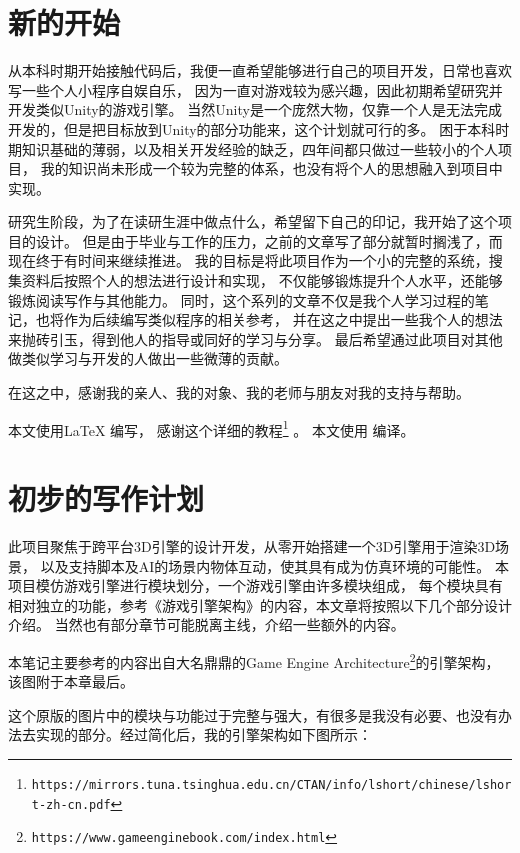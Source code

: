 \section{新的开始}

从本科时期开始接触代码后，我便一直希望能够进行自己的项目开发，日常也喜欢写一些个人小程序自娱自乐，
因为一直对游戏较为感兴趣，因此初期希望研究并开发类似Unity的游戏引擎。
当然Unity是一个庞然大物，仅靠一个人是无法完成开发的，但是把目标放到Unity的部分功能来，这个计划就可行的多。
困于本科时期知识基础的薄弱，以及相关开发经验的缺乏，四年间都只做过一些较小的个人项目，
我的知识尚未形成一个较为完整的体系，也没有将个人的思想融入到项目中实现。

研究生阶段，为了在读研生涯中做点什么，希望留下自己的印记，我开始了这个项目的设计。
但是由于毕业与工作的压力，之前的文章写了部分就暂时搁浅了，而现在终于有时间来继续推进。
我的目标是将此项目作为一个小的完整的系统，搜集资料后按照个人的想法进行设计和实现，
不仅能够锻炼提升个人水平，还能够锻炼阅读写作与其他能力。
同时，这个系列的文章不仅是我个人学习过程的笔记，也将作为后续编写类似程序的相关参考，
并在这之中提出一些我个人的想法来抛砖引玉，得到他人的指导或同好的学习与分享。
最后希望通过此项目对其他做类似学习与开发的人做出一些微薄的贡献。

在这之中，感谢我的亲人、我的对象、我的老师与朋友对我的支持与帮助。

本文使用\LaTeX{} 编写，
感谢这个详细的教程\footnote{\nolinkurl{https://mirrors.tuna.tsinghua.edu.cn/CTAN/info/lshort/chinese/lshort-zh-cn.pdf}} 。
本文使用\XeLaTeX{} 编译。

\maketitle
\section{初步的写作计划}

此项目聚焦于跨平台3D引擎的设计开发，从零开始搭建一个3D引擎用于渲染3D场景，
以及支持脚本及AI的场景内物体互动，使其具有成为仿真环境的可能性。
本项目模仿游戏引擎进行模块划分，一个游戏引擎由许多模块组成，
每个模块具有相对独立的功能，参考《游戏引擎架构》的内容，本文章将按照以下几个部分设计介绍。
当然也有部分章节可能脱离主线，介绍一些额外的内容。

本笔记主要参考的内容出自大名鼎鼎的Game Engine Architecture\footnote{\nolinkurl{https://www.gameenginebook.com/index.html}}的引擎架构，
该图附于本章最后。

这个原版的图片中的模块与功能过于完整与强大，有很多是我没有必要、也没有办法去实现的部分。经过简化后，我的引擎架构如下图所示：

